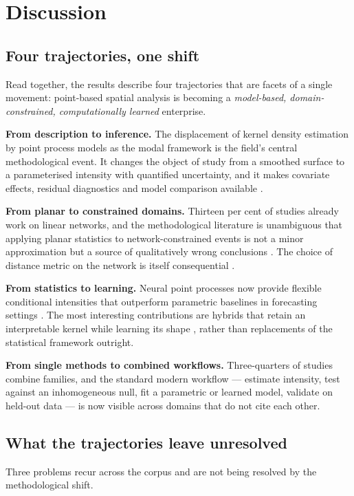 \documentclass[11pt,a4paper]{article}
\begin{document}
\section{Discussion}

\subsection{Four trajectories, one shift}
Read together, the results describe four trajectories that are facets of a
single movement: point-based spatial analysis is becoming a
\emph{model-based, domain-constrained, computationally learned} enterprise.

\textbf{From description to inference.} The displacement of kernel density
estimation by point process models as the modal framework is the field's
central methodological event. It changes the object of study from a smoothed
surface to a parameterised intensity with quantified uncertainty, and it makes
covariate effects, residual diagnostics and model comparison available
\citep{diggle2013b,renner2015,merow2016}.

\textbf{From planar to constrained domains.} Thirteen per cent of studies
already work on linear networks, and the methodological literature is
unambiguous that applying planar statistics to network-constrained events is
not a minor approximation but a source of qualitatively wrong conclusions
\citep{okabe2009,baddeley2020,rakshit2017}. The choice of distance metric on
the network is itself consequential \citep{rakshit2017}.

\textbf{From statistics to learning.} Neural point processes now provide
flexible conditional intensities that outperform parametric baselines in
forecasting settings \citep{chen2020,zhou2021,stockman2023,zlydenko2023}.
The most interesting contributions are hybrids that retain an interpretable
kernel while learning its shape \citep{cheng2025,muir2023,mateu2022}, rather
than replacements of the statistical framework outright.

\textbf{From single methods to combined workflows.} Three-quarters of studies
combine families, and the standard modern workflow --- estimate intensity,
test against an inhomogeneous null, fit a parametric or learned model,
validate on held-out data --- is now visible across domains that do not cite
each other.

\subsection{What the trajectories leave unresolved}
Three problems recur across the corpus and are not being resolved by the
methodological shift.
\end{document}
